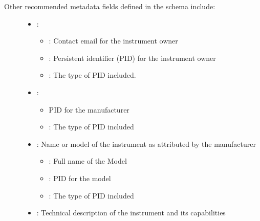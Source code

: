 \documentclass[letterpaper,10pt,english]{sphinxmanual}
\begin{document}
\begin{description}
\item[{Other recommended metadata fields defined in the schema include:}] \leavevmode\begin{itemize}
\item {}
\sphinxAtStartPar
{}:
\begin{itemize}
\item {}
\sphinxAtStartPar
{}: Contact email for the instrument owner

\item {}
\sphinxAtStartPar
{}: Persistent identifier (PID) for the instrument owner

\item {}
\sphinxAtStartPar
{}: The type of PID included.

\end{itemize}

\item {}
\sphinxAtStartPar
{}:
\begin{itemize}
\item {}
\sphinxAtStartPar
{} PID for the manufacturer

\item {}
\sphinxAtStartPar
{}: The type of PID included

\end{itemize}

\item {}
\sphinxAtStartPar
{}: Name or model of the instrument as attributed by the manufacturer
\begin{itemize}
\item {}
\sphinxAtStartPar
{}: Full name of the Model

\item {}
\sphinxAtStartPar
{}: PID for the model

\item {}
\sphinxAtStartPar
{}: The type of PID included

\end{itemize}

\item {}
\sphinxAtStartPar
{}: Technical description of the instrument and its capabilities


\end{itemize}
\end{description}
\end{document}
